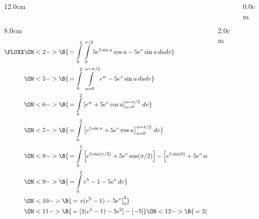 \begin{frame}
\begin{columns}\begin{column}{12.0cm}
\scriptsize
\begin{columns}
\begin{column}{8.0cm}
\begin{align*}
	\FLUXX 
	&\ON<2->{\B{\, = \int \limits_{0}^{2}\int \limits_{0}^{\pi/2} 5e^{5\sin u}\cos u - 5e^v\sin u \, dudv}} \\
	&\ON<5->{\B{\, = \int \limits_{0}^{2}\int \limits_{u=0}^{u=\pi/2} e^w - 5e^v\sin u\, dudv}} \\
	&\ON<6->{\B{\, = \int \limits_{0}^{2}\left[e^w + 5e^v\cos u \right]_{u=0}^{u=\pi/2} \, dv}} \\
	&\ON<7->{\B{\, = \int \limits_{0}^{2}\left[e^{5\sin u} + 5e^v\cos u \right]_{u=0}^{u=\pi/2} \, dv}} \\
	&\ON<8->{\B{\, = \int \limits_{0}^{2}\left[e^{5\sin (\pi/2)} + 5e^v\cos (\pi/2) \right]-\left[e^{5\sin (0)} + 5e^v\cos (0) \right] \, dv}} \\
	&\ON<9->{\B{\, = \int \limits_{0}^{2}e^{5}-1 - 5e^v \, dv}}\\
	&\ON<10->{\B{\, = \left.v(e^{5}-1) - 5e^v \right|_0^2}} \\
	&\ON<11->{\B{\, = [2(e^{5}-1) - 5e^2] - [-5]}}
	\ON<12->{\B{\, = 2(e^{5}-1) - 5e^2 + 5}}
\end{align*}
\end{column}
\begin{column}{2.0cm}
	\ON<3->{\B{$\D{w=5\sin u}$}}
	
	\vspace{0.2cm}
	
	
	\vspace{6.2cm}
	
\end{column}
\end{columns}

\vspace{4.2cm}

\end{column}\begin{column}{0.0cm}\end{column}\end{columns}
\end{frame}

